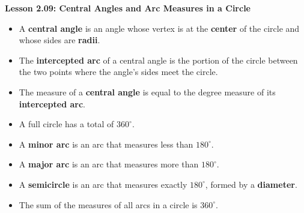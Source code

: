 \begin{center}
\textbf{Lesson 2.09: Central Angles and Arc Measures in a Circle}
\end{center}

\vspace*{-1.5ex}


\begin{itemize}
    \item A \textbf{central angle} is an angle whose vertex is at the \textbf{center} of the circle and whose sides are \textbf{radii}.
    \item The \textbf{intercepted arc} of a central angle is the portion of the circle between the two points where the angle's sides meet the circle.
    \item The measure of a \textbf{central angle} is equal to the degree measure of its \textbf{intercepted arc}.
    \item A full circle has a total of $360^\circ$.
    \item A \textbf{minor arc} is an arc that measures less than $180^\circ$.
    \item A \textbf{major arc} is an arc that measures more than $180^\circ$.
    \item A \textbf{semicircle} is an arc that measures exactly $180^\circ$, formed by a \textbf{diameter}.
    \item The sum of the measures of all arcs in a circle is $360^\circ$.
\end{itemize}

